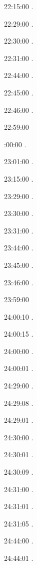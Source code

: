 22:15:00 . 

22:29:00 . 

22:30:00 .

22:31:00 .

22:44:00 .

22:45:00 .

22:46:00 .

22:59:00 

:00:00 .

23:01:00 . 

23:15:00 . 

23:29:00 . 

23:30:00 .

23:31:00 .

23:44:00 .

23:45:00 .

23:46:00 .

23:59:00 
\newpage

24:00:10 .

24:00:15 . 

24:00:00 . 

24:00:01 . 

24:29:00 . 

24:29:08 . 

24:29:01 . 

24:30:00 .

24:30:01 .

24:30:09 .

24:31:00 .

24:31:01 .

24:31:05 .

24:44:00 .

24:44:01 .

